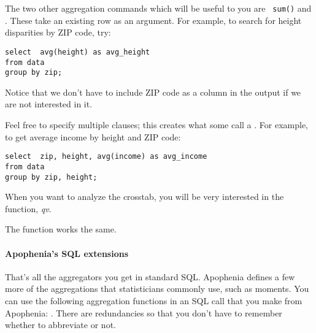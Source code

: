 \label{crosstabs}


The two other aggregation commands which will be useful to you are {\tt
sum()} and . These take an existing row as an argument.
For example, to search for height disparities by ZIP code, try:
\begin{lstlisting}
select  avg(height) as avg_height
from data
group by zip;
\end{lstlisting}
Notice that we don't have to include ZIP code as a column in the output
if we are not interested in it.

Feel free to specify multiple  clauses; this creates what
some call a . For example, to get average income by
height and ZIP code: 
\begin{lstlisting}
select  zip, height, avg(income) as avg_income
from data
group by zip, height;
\end{lstlisting}

When you want to analyze the crosstab, you will be very
interested in the  function, {\em qv}.

The function  works the same. 

\paragraph{Apophenia's SQL extensions}
That's all the aggregators you get in standard SQL.
Apophenia defines a few more of the aggregations that statisticians
commonly use, such as moments. You can use the following aggregation
functions in an SQL call that you make from Apophenia: . There are redundancies so that you
don't have to remember whether to abbreviate or not.

